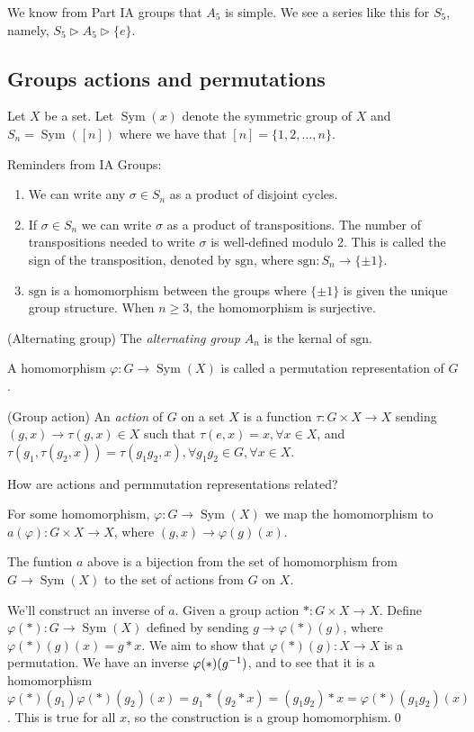 \documentclass{article}
\DeclareMathOperator{\sym}{Sym}
\begin{document}
\par
 We know from Part IA groups that $ A_5 $ is simple. We see a series like this for $ S_5 $, namely, $ S_5\triangleright A_5\triangleright \{e\} $.
 \subsection{Groups actions and permutations}

\begin{definition}
	Let $ X $ be a set. Let $ \sym(x) $ denote the symmetric group of $ X $ and $ S_n=\sym([n]) $ where we have that $ [n]=\{1,2,\dots, n\} $.
\end{definition}
Reminders from IA Groups:
\begin{enumerate}
	\item We can write any $ \sigma\in S_n $ as a product of disjoint cycles.
	\item If $ \sigma \in S_n $ we can write $ \sigma $ as a product of transpositions. The number of transpositions needed to write $ \sigma $ is well-defined modulo 2. This is called the sign of the transposition, denoted by $ \mathrm {sgn} $, where $ \mathrm{sgn}: S_n\to \{\pm 1\} $.
	\item $ \mathrm{sgn} $ is a homomorphism between the groups where $ \{\pm 1\} $ is given the unique group structure. When $ n\ge 3 $, the homomorphism is surjective.
\end{enumerate}
\begin{definition}
	(Alternating group) The \textit{alternating group} $ A_n $ is the kernal of $ \mathrm{sgn} $.
\end{definition}
A homomorphism $ \varphi: G\to \sym(X) $ is called a permutation representation of $ G $.
\begin{definition}
	(Group action) An \textit{action} of $ G $ on a set $ X $ is a function $ \tau:G\times X\to X $ sending $ (g,x) \to \tau(g,x)\in X $ such that $ \tau(e,x)=x, \forall x\in X $, and $ \tau(g_1,\tau(g_2,x))=\tau(g_1g_2,x), \forall g_1g_2\in G, \forall x\in X $.
\end{definition}
How are actions and permmutation representations related?

For some homomorphism, $ \varphi: G\to\sym(X) $ we map the homomorphism to $ a(\varphi):G\times X\to X $, where $ (g,x)\to\varphi(g)(x) $.
\begin{proposition}
  The funtion $ a $ above is a bijection from the set of homomorphism from $ G\to\sym(X) $ to the set of actions from $ G $ on $ X $.
\end{proposition}
\pf We'll construct an inverse of $ a $. Given a group action $ *:G\times X \to X $. Define $ \varphi(*): G\to \sym(X) $ defined by sending $ g\to\varphi(*)(g) $, where $ \varphi(*)(g)(x)=g*x $. We aim to show that $ \varphi(*)(g):X\to X $ is a permutation. We have an inverse $ \varphi(*)({g}^{-1}) $, and to see that it is a homomorphism $ \varphi(*)(g_1)\varphi(*)(g_2)(x)=g_1*(g_2*x)=(g_1g_2)*x=\varphi(*)(g_1g_2)(x) $. This is true for all $ x $, so the construction is a group homomorphism.\qed
\end{document}
